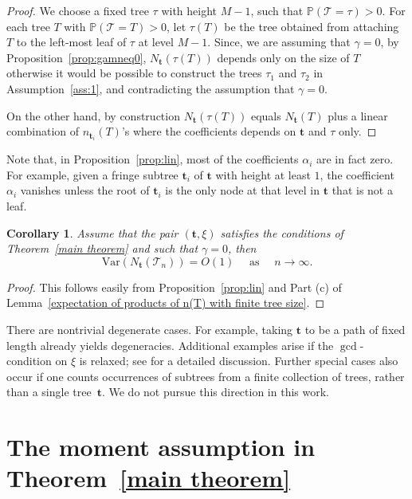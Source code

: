 \documentclass[article]{amsart}
\newcommand{\tc}{\mathcal{T}}
\newcommand{\st}{\textbf{t}}
\newtheorem{corollary}[theorem]{Corollary}
\theoremstyle{definition}
\theoremstyle{remark}
\begin{document}
\begin{proof}
    We choose a fixed tree $\tau$ with height $M-1$, such that $\mathbb{P}(\tc=\tau)>0$. For each tree $T$ with $\mathbb{P}(\tc=T)>0$, let $\tau(T)$ be the tree obtained from attaching $T$ to the left-most leaf of $\tau$ at level $M-1$. Since, we are assuming that $\gamma=0$, by Proposition~\ref{prop:gamneq0}, $N_{\st}(\tau(T))$ depends only on the size of $T$ otherwise it would be possible to construct the trees $\tau_1$ and $\tau_2$ in Assumption~\ref{ass:1}, and contradicting the assumption that $\gamma=0$.
    
    On the other hand, by construction $N_{\st}(\tau(T))$ equals $N_{\st}(T)$ plus a linear combination of $n_{\st_i}(T)$'s where the coefficients depends on $\st$ and $\tau$ only. 
\end{proof}

Note that, in Proposition~\ref{prop:lin}, most of the coefficients $\alpha_i$ are in fact zero. For example, given a fringe subtree $\st_i$ of $\st$ with height at least $1$, the coefficient $\alpha_i$ vanishes unless the root of $\st_i$ is the only node at that level in $\st$ that is not a leaf. 

\begin{corollary}
    Assume that the pair $(\st,\xi)$ satisfies the conditions of Theorem~\ref{main theorem} and such that $\gamma= 0$, then
    \[
    \mathrm{Var}(N_{\st}(\tc_n))=O(1) \quad \text{ as } \quad n\to \infty.
    \]
\end{corollary}

\begin{proof}
    This follows easily from Proposition~\ref{prop:lin} and Part (c) of Lemma~\ref{expectation of products of n(T) with finite tree size}.
\end{proof}

There are nontrivial degenerate cases. For example, taking $\st$ to be a path of fixed length already yields degeneracies. Additional examples arise if the $\gcd$-condition on $\xi$ is relaxed; see \cite{J21} for a detailed discussion. Further special cases also occur if one counts occurrences of subtrees from a finite collection of trees, rather than a single tree~$\st$. We do not pursue this direction in this work.

\section{The moment assumption in Theorem~\ref{main theorem}}\label{sec5}
\end{document}
